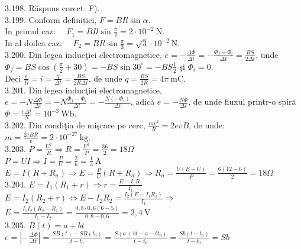 \begin{center}
3.198. Răspuns corect: F).\\

3.199. Conform definiției, $F=B I l \sin \alpha$.\\ In primul caz: $\quad F_{1}=B I l \sin \frac{\pi}{2}=2 \cdot 10^{-2} \mathrm{~N}$.\\In al doilea caz: $\quad F_{2}=B I l \sin \frac{\pi}{3}=\sqrt{3} \cdot 10^{-2} \mathrm{~N}$.\\

3.200. Din legea inducţiei electromagnetice, $e=-\frac{\Delta \Phi}{\Delta t}=-\frac{\Phi_{f}-\Phi_{i}}{\Delta t}=\frac{B S}{2 \Delta t}$, unde $\Phi_{f}=B S \cos \left(\frac{\pi}{2}+30\right)=-B S \sin 30^{\circ}=-B S \frac{1}{2}$ şi $\Phi_{i}=0$.\\ Deci $\frac{e}{R}=i=\frac{q}{\Delta t}=\frac{B S}{2 R \Delta t}$, de unde $q=\frac{B S}{2 R}=4 \pi \mathrm{~mC}$.\\

3.201. Din legea inducţiei electromagnetice,\\$e=-N \frac{\Delta \Phi}{\Delta t}=-N \frac{\Phi_{f}-\Phi_{i}}{\Delta t}=-\frac{N\left(-\Phi_{i}\right)}{\Delta t}$, adică $e=-\frac{N \Phi}{\Delta t}$, de unde fluxul printr-o spiră $\Phi=\frac{e \Delta t}{N}=10^{-3} \mathrm{~Wb}$.\\

3.202. Din condiţia de mişcare pe cerc, $\frac{m v^{2}}{R}=2 e v B$, de unde:\\$m=\frac{2 e B R}{v}=2 \cdot 10^{-27} \mathrm{~kg} .$\\

3.203. $P=\frac{U^{2}}{R} \Rightarrow R=\frac{U^{2}}{P}=\frac{36}{2}=18 \Omega$\\$P=U I \Rightarrow I=\frac{P}{U}=\frac{2}{6}=\frac{1}{3} \mathrm{~A}$\\$E=I\left(R+R_{a}\right) \Rightarrow E=\frac{P}{U}\left(R+R_{a}\right) \Rightarrow R_{a}=\frac{U(E-U)}{P}=\frac{6(12-6)}{2}=18 \Omega$\\

3.204. $E=I_{1}\left(R_{1}+r\right) \Rightarrow r=\frac{E-I_{1} R_{1}}{I_{1}}$\\$E=I_{2}\left(R_{2}+r\right) \Leftrightarrow E-I_{2} R_{2}=\frac{I_{2}\left(E-I_{1} R_{1}\right)}{I_{1}} \Rightarrow$\\$E=\frac{I_{1} I_{2}\left(R_{2}-R_{1}\right)}{I_{1}-I_{2}}=\frac{0,8 \cdot 0,6(6-5)}{0,8-0,6}=2,4 \mathrm{~V}$\\

3.205. $B(t)=a+b t$\\ $e=\left|-\frac{\Delta \Phi}{\Delta t}\right|=\frac{S B(t)-S B\left(t_{0}\right)}{t-t_{0}}=\frac{S\left(a+b t-a-b t_{0}\right)}{t-t_{0}}=\frac{S b\left(t-t_{0}\right)}{t-t_{0}}=S b$\\


\end{center}
